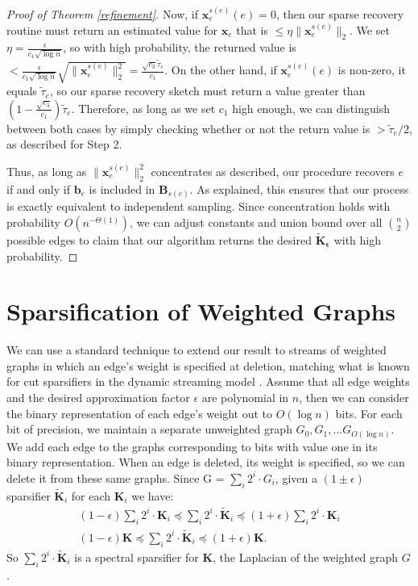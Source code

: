 \documentclass[11pt]{article}
\newcommand{\norm}[1]{\|#1\|}
\newcommand{\bv}[1]{\mathbf{#1}}
\begin{document}
\begin{proof}[Proof of Theorem \ref{refinement}]
Now, if $\bv{x}_e^{s(e)}(e) = 0$, then our sparse recovery routine must return an estimated value for $\bv{x}_e$ that is $\leq \eta \norm{\bv{x}_e^{s(e)}}_2$. We set $\eta = \frac{\epsilon}{c_1 \sqrt{\log n}}$, so with high probability, the returned value is $< \frac{\epsilon}{c_1 \sqrt{\log n}}\sqrt{\norm{\bv{x}_e^{s(e)}}_2^2} = \frac{\sqrt{c_3}\tilde{\tau}_e}{c_1}$. On the other hand, if $\bv{x}_e^{s(e)}(e)$ is non-zero, it equals $\tilde{\tau}_e$, so our sparse recovery sketch must return a value greater than $(1 - \frac{\sqrt{c_3}}{c_1})\tilde{\tau}_e$. Therefore, as long as we set $c_1$ high enough, we can distinguish between both cases by simply checking whether or not the return value is $> \tilde{\tau}_e/2$, as described for Step 2.

Thus, as long as $\norm{\bv{x}_e^{s(e)}}_2^2$ concentrates as described, our procedure recovers $e$ if and only if $\bv{b}_e$ is included in $\bv{B}_{s(e)}$. As explained, this ensures that our process is exactly equivalent to independent sampling. Since concentration holds with probability $O(n^{-\Theta(1)})$, we can adjust constants and union bound over all ${n \choose 2}$ possible edges to claim that our algorithm returns the desired $\bv{\tilde K_\epsilon}$ with high probability.

\end{proof}





\section{Sparsification of Weighted Graphs}\label{weighted}

We can use a standard technique to extend our result to streams of weighted graphs in which an edge's weight is specified at deletion, matching what is known for cut sparsifiers in the dynamic streaming model \cite{gssss,goel2012single}. Assume that all edge weights and the desired approximation factor $\epsilon$ are polynomial in $n$, then we can consider the binary representation of each edge's weight out to $O(\log n)$ bits. For each bit of precision, we maintain a separate unweighted graph $G_0, G_1, ...G_{O(\log n)}$. We add each edge to the graphs corresponding to bits with value one in its binary representation. When an edge is deleted, its weight is specified, so we can delete it from these same graphs. Since G = $ \sum_i 2^i \cdot G_i$, given a $(1 \pm \epsilon)$ sparsifier $ \bv{\tilde K}_i$ for each $\bv{K}_i$ we have:
\begin{align*}
(1-\epsilon) \sum_i 2^i \cdot \bv{K}_i \preceq  \sum_i 2^i \cdot \bv{\tilde K}_i \preceq (1+\epsilon) \sum_i 2^i \cdot \bv{K}_i\\
(1-\epsilon) \bv{K} \preceq  \sum_i 2^i \cdot \bv{\tilde K}_i \preceq (1+\epsilon) \bv{K}.
\end{align*}
So $ \sum_i 2^i \cdot \bv{\tilde K}_i$ is a spectral sparsifier for $\bv{K}$, the Laplacian of the weighted graph $G$.
\end{document}
